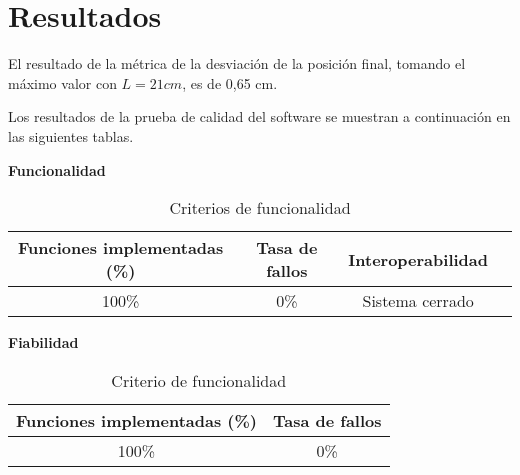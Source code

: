 \section{Resultados}

El resultado de la métrica de la desviación de la posición final, tomando el máximo valor con $L = 21 cm$, es de 0,65 cm.

Los resultados de la prueba de calidad del software se muestran a continuación en las siguientes tablas.

\textbf{Funcionalidad}

\begin{table}[ht]
	\centering
	\begin{tabular}{|c|c|c|c|}
		\hline
		\textbf{Funciones implementadas (\%)} & \textbf{Tasa de fallos} & \textbf{Interoperabilidad} \\
		\hline
		100\% & 0\% & Sistema cerrado \\
		\hline
	\end{tabular}
	\caption{Criterios de funcionalidad}
	\label{tab:Resultados}
\end{table}

\textbf{Fiabilidad}

\begin{table}[ht]
	\centering
	\begin{tabular}{|c|c|}
		\hline
		\textbf{Funciones implementadas (\%)} & \textbf{Tasa de fallos} \\
		\hline
		100\% & 0\% \\
		\hline
	\end{tabular}
	\caption{Criterio de funcionalidad}
	\label{tab:Resultados}
\end{table}
